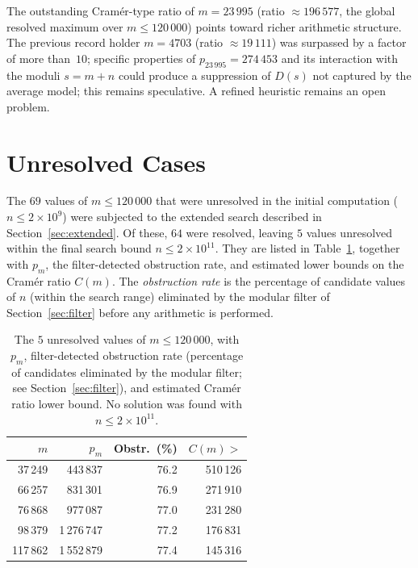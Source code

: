 \documentclass{amsart}
\theoremstyle{definition}
\theoremstyle{remark}
\numberwithin{equation}{section}
\begin{document}
The outstanding Cram\'er-type ratio of $m = 23\,995$
(ratio $\approx 196\,577$, the global resolved maximum over
$m \leq 120\,000$) points toward richer arithmetic structure.
The previous record holder $m = 4703$ (ratio $\approx 19\,111$)
was surpassed by a factor of more than~$10$; specific properties of
$p_{23\,995} = 274\,453$ and its
interaction with the moduli $s = m+n$ could produce a suppression
of $D(s)$ not captured by the average model; this remains speculative.
A refined heuristic remains an open problem.

\section{Unresolved Cases}
\label{sec:notfound}

The $69$ values of $m \leq 120\,000$ that were unresolved in the
initial computation ($n \leq 2 \times 10^9$) were subjected to the
extended search described in Section~\ref{sec:extended}.
Of these, $64$ were resolved, leaving $5$ values unresolved
within the final search bound $n \leq 2 \times 10^{11}$.
They are listed in Table~\ref{tab:notfound}, together with $p_m$,
the filter-detected obstruction rate, and estimated lower bounds on
the Cram\'er ratio $C(m)$.
The \emph{obstruction rate} is the percentage of candidate values of $n$
(within the search range) eliminated by the modular filter of
Section~\ref{sec:filter} before any arithmetic is performed.

\begin{table}[ht]
\centering
\caption{The $5$ unresolved values of $m \leq 120\,000$, with $p_m$,
	filter-detected obstruction rate (percentage of candidates
	eliminated by the modular filter; see Section~\ref{sec:filter}),
	and estimated Cram\'er ratio lower bound.
	No solution was found with $n \leq 2 \times 10^{11}$.}
\label{tab:notfound}
\small
\begin{tabular}{rrrr}
	\toprule
	$m$ & $p_m$ & Obstr.\ (\%) & $C(m) >$ \\
	\midrule
	37\,249  &   443\,837 & 76.2 & 510\,126 \\
	66\,257  &   831\,301 & 76.9 & 271\,910 \\
	76\,868  &   977\,087 & 77.0 & 231\,280 \\
	98\,379  & 1\,276\,747 & 77.2 & 176\,831 \\
	117\,862 & 1\,552\,879 & 77.4 & 145\,316 \\
	\bottomrule
\end{tabular}
\end{table}
\end{document}
